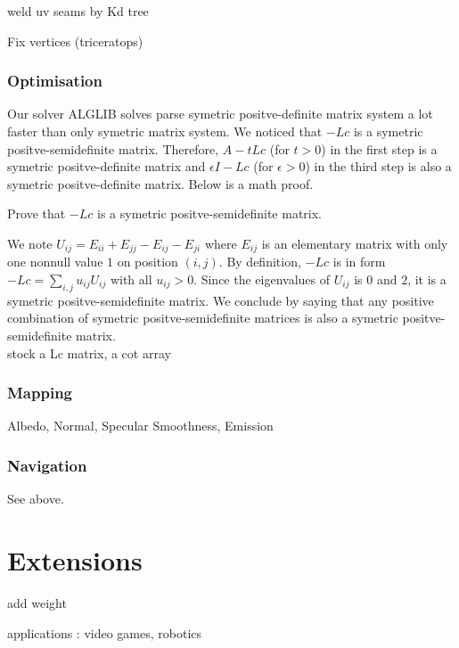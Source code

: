 \documentclass[a4paper,12pt,twoside]{article}
\begin{document}
weld uv seams by Kd tree

Fix vertices (triceratops)

\subsubsection{Optimisation}
Our solver ALGLIB solves parse symetric positve-definite matrix system a lot faster than only symetric matrix system.
We noticed that $-Lc$ is a symetric positve-semidefinite matrix.
Therefore, $A-tLc$ (for $t>0$) in the first step is a symetric positve-definite matrix and $\epsilon I-Lc$ (for $\epsilon >0$) in the third step is also a symetric positve-definite matrix. Below is a math proof.

Prove that $-Lc$ is a symetric positve-semidefinite matrix.

We note $U_{ij}=E_{ii}+E_{jj}-E_{ij}-E_{ji}$ where $E_{ij}$ is an elementary matrix with only one nonnull value $1$ on position $(i,j)$. By definition, $-Lc$ is in form  $-Lc=\sum_{i,j}u_{ij}U_{ij}$ with all $u_{ij}>0$. Since the eigenvalues of $U_{ij}$ is $0$ and $2$, it is a symetric positve-semidefinite matrix. We conclude by saying that any positive combination of symetric positve-semidefinite matrices is also a symetric positve-semidefinite matrix.\\

stock a Lc matrix, a cot array

\subsubsection{Mapping}
Albedo, Normal, Specular Smoothness, Emission

\subsubsection{Navigation}
See above.

\section{Extensions}
add weight

applications : video games, robotics
\end{document}
